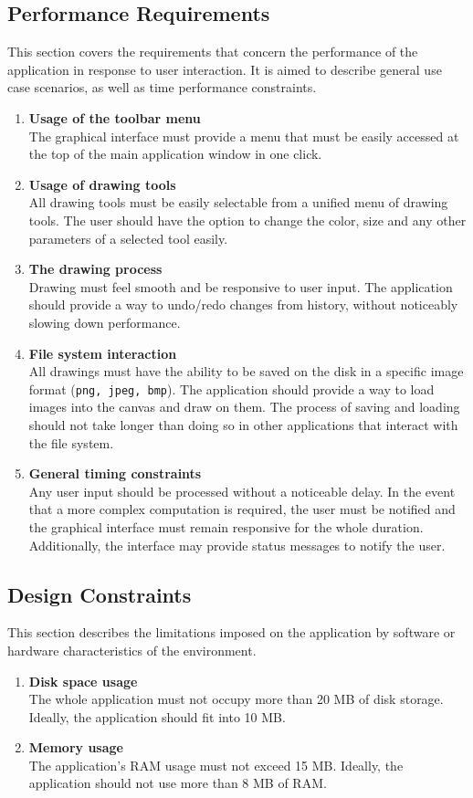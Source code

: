 \documentclass[12pt]{article}
\begin{document}
\subsection{Performance Requirements}
This section covers the requirements that concern the performance of the application in response to user interaction. It is aimed to describe general use case scenarios, as well as time performance constraints.
\begin{enumerate}
\item \textbf{Usage of the toolbar menu}
\\
The graphical interface must provide a menu that must be easily accessed at the top of the main application window in one click.
\item \textbf{Usage of drawing tools}
\\
All drawing tools must be easily selectable from a unified menu of drawing tools. The user should have the option to change the color, size and any other parameters of a selected tool easily.
\item \textbf{The drawing process}
\\
Drawing must feel smooth and be responsive to user input. The application should provide a way to undo/redo changes from history, without noticeably slowing down performance.
\item \textbf{File system interaction}
\\
All drawings must have the ability to be saved on the disk in a specific image format (\texttt{png, jpeg, bmp}). The application should provide a way to load images into the canvas and draw on them. The process of saving and loading should not take longer than doing so in other applications that interact with the file system.
\item \textbf{General timing constraints}
\\
Any user input should be processed without a noticeable delay. In the event that a more complex computation is required, the user must be notified and the graphical interface must remain responsive for the whole duration. Additionally, the interface may provide status messages to notify the user.
\end{enumerate}

\subsection{Design Constraints}
This section describes the limitations imposed on the application by software or hardware characteristics of the environment.
\begin{enumerate}
\item \textbf{Disk space usage}
\\
The whole application must not occupy more than 20 MB of disk storage.
Ideally, the application should fit into 10 MB.
\item \textbf{Memory usage}
\\
The application's RAM usage must not exceed 15 MB.
Ideally, the application should not use more than 8 MB of RAM.
\end{enumerate}
\end{document}
